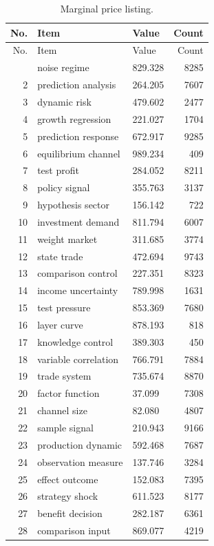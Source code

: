 \documentclass[11pt]{report}
\begin{document}
\begin{longtable}{rllr}\caption{Marginal price listing.}\label{tab:l5}\\\toprule No. & Item & Value & Count \\ \midrule \endfirsthead\toprule No. & Item & Value & Count \\ \midrule \endhead\bottomrule \endfoot
1 & noise regime & 829.328 & 8285 \\
2 & prediction analysis & 264.205 & 7607 \\
3 & dynamic risk & 479.602 & 2477 \\
4 & growth regression & 221.027 & 1704 \\
5 & prediction response & 672.917 & 9285 \\
6 & equilibrium channel & 989.234 & 409 \\
7 & test profit & 284.052 & 8211 \\
8 & policy signal & 355.763 & 3137 \\
9 & hypothesis sector & 156.142 & 722 \\
10 & investment demand & 811.794 & 6007 \\
11 & weight market & 311.685 & 3774 \\
12 & state trade & 472.694 & 9743 \\
13 & comparison control & 227.351 & 8323 \\
14 & income uncertainty & 789.998 & 1631 \\
15 & test pressure & 853.369 & 7680 \\
16 & layer curve & 878.193 & 818 \\
17 & knowledge control & 389.303 & 450 \\
18 & variable correlation & 766.791 & 7884 \\
19 & trade system & 735.674 & 8870 \\
20 & factor function & 37.099 & 7308 \\
21 & channel size & 82.080 & 4807 \\
22 & sample signal & 210.943 & 9166 \\
23 & production dynamic & 592.468 & 7687 \\
24 & observation measure & 137.746 & 3284 \\
25 & effect outcome & 152.083 & 7395 \\
26 & strategy shock & 611.523 & 8177 \\
27 & benefit decision & 282.187 & 6361 \\
28 & comparison input & 869.077 & 4219 \\

\end{longtable}
\end{document}
